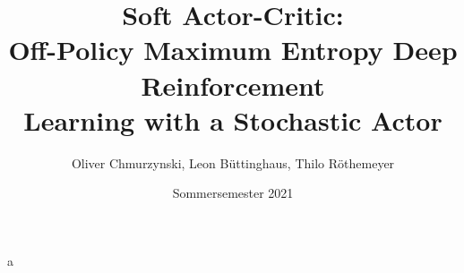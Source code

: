 \documentclass{article}
\title{\vspace{-2.0cm}Soft Actor-Critic:\\
Off-Policy Maximum Entropy Deep Reinforcement\\
Learning with a Stochastic Actor}
\date{Sommersemester 2021}
\author{Oliver Chmurzynski, Leon Büttinghaus, Thilo Röthemeyer}
\begin{document}
\maketitle

a
\end{document}
